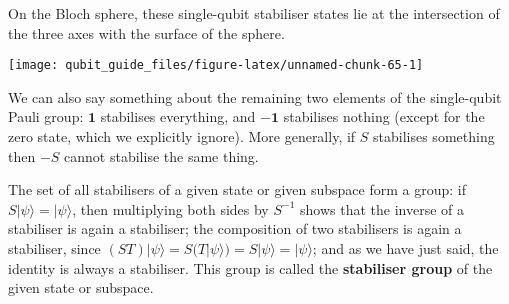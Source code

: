 \documentclass[fleqn]{article}
\begin{document}
On the Bloch sphere, these single-qubit stabiliser states lie at the intersection of the three axes with the surface of the sphere.

\begin{center}\texttt{[image: qubit\_guide\_files/figure-latex/unnamed-chunk-65-1]} \end{center}

We can also say something about the remaining two elements of the single-qubit Pauli group: \(\mathbf{1}\) stabilises everything, and \(-\mathbf{1}\) stabilises nothing (except for the zero state, which we explicitly ignore).
More generally, if \(S\) stabilises something then \(-S\) cannot stabilise the same thing.

The set of all stabilisers of a given state or given subspace form a group: if \(S|\psi\rangle=|\psi\rangle\), then multiplying both sides by \(S^{-1}\) shows that the inverse of a stabiliser is again a stabiliser; the composition of two stabilisers is again a stabiliser, since \((ST)|\psi\rangle=S(T|\psi\rangle)=S|\psi\rangle=|\psi\rangle\); and as we have just said, the identity is always a stabiliser.
This group is called the \textbf{stabiliser group} of the given state or subspace.
\end{document}
